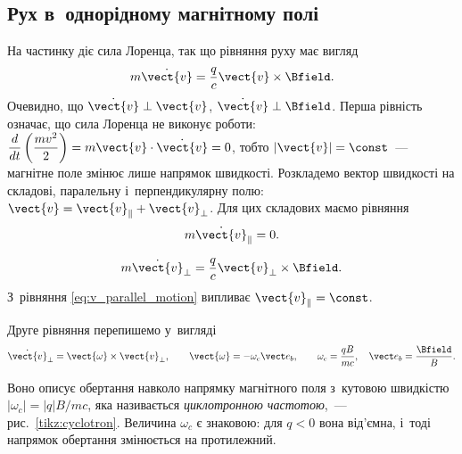 \subsection*{Рух в~однорідному магнітному полі}


На частинку діє сила Лоренца, так що рівняння руху має вигляд
\begin{equation}\label{eq:Lorentz_motion}
	m\dot{\vect{v}} = \frac{q}{c}\vect{v} \times \Bfield.
\end{equation}
Очевидно, що $\dot{\vect{v}} \perp \vect{v}$, $\dot{\vect{v}} \perp \Bfield$. Перша рівність означає, що сила Лоренца не виконує роботи: $\dfrac{d}{dt}\left(\dfrac{mv^2}{2}\right) = m\vect{v}\cdot\dot{\vect{v}} = 0$, тобто $|\vect{v}| = \const$~--- магнітне поле змінює лише напрямок швидкості. Розкладемо вектор швидкості на складові, паралельну і~перпендикулярну полю: $\vect{v} = \vect{v}_{\parallel} + \vect{v}_{\perp}$. Для цих складових маємо рівняння
\begin{equation}\label{eq:v_parallel_motion}
	m\dot{\vect{v}}_{\parallel} = 0.
\end{equation}

\begin{equation}\label{eq:v_perp_motion}
	m\dot{\vect{v}}_{\perp} = \frac{q}{c}\vect{v}_{\perp} \times \Bfield.
\end{equation}
З~рівняння \eqref{eq:v_parallel_motion} випливає $\vect{v}_{\parallel} = \const$.

Друге рівняння перепишемо у~вигляді
\begin{equation}\label{eq:v_perp_rotation}
	\dot{\vect{v}}_{\perp} = \vect{\omega} \times \vect{v}_{\perp}, \qquad
	\vect{\omega} = -\omega_c\vect e_b, \qquad
	\omega_c = \frac{qB}{mc}, \quad \vect e_b = \frac{\Bfield}{B}.
\end{equation}

Воно описує обертання навколо напрямку магнітного поля з~кутовою швидкістю $|\omega_c| = |q|B/mc$, яка називається \emph{циклотронною частотою},~--- рис.~\ref{tikz:cyclotron}. Величина $\omega_c$ є знаковою: для $q<0$ вона від'ємна, і~тоді напрямок обертання змінюється на протилежний.

